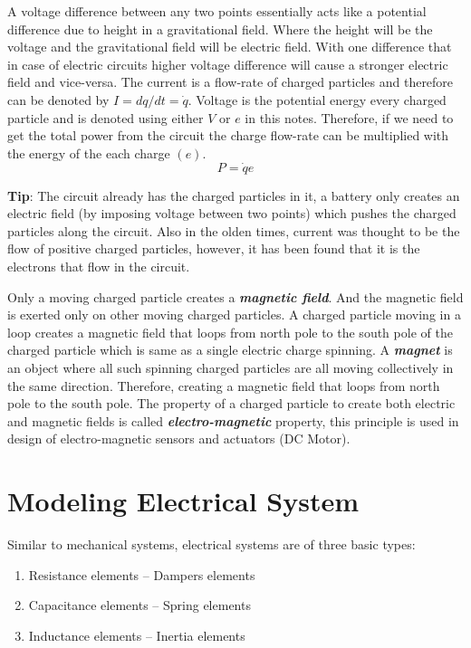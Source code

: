 A voltage difference between any two points essentially acts like a potential difference due to height in a gravitational field. Where the height will be the voltage and the gravitational field will be electric field. With one difference that in case of electric circuits higher voltage difference will cause a stronger electric field and vice-versa. The current is a flow-rate of charged particles and therefore can be denoted by $I  = dq/dt = \dot{q}$. Voltage is the potential energy every charged particle and is denoted using either $V$ or $e$ in this notes. Therefore, if we need to get the total power from the circuit the charge flow-rate can be multiplied with the energy of the each charge $(e)$. $$ P = \dot{q} e $$

\textbf{Tip}: The circuit already has the charged particles in it, a battery only creates an electric field (by imposing voltage between two points) which pushes the charged particles along the circuit. Also in the olden times, current was thought to be the flow of positive charged particles, however, it has been found  that it is the electrons that flow in the circuit.

Only a moving charged particle creates a \textbf{\textit{magnetic field}}. And the magnetic field is exerted only on other moving charged particles. A charged particle moving in a loop creates a magnetic field that loops from north pole to the south pole of the charged particle which is same as a single electric charge spinning. A \textbf{\textit{magnet}} is an object where all such spinning charged particles are all moving collectively in the same direction. Therefore, creating a magnetic field that loops from north pole to the south pole. The property of a charged particle to create both electric and magnetic fields is called \textbf{\textit{electro-magnetic}} property, this principle is used in design of electro-magnetic sensors and actuators (DC Motor).

\section{Modeling Electrical System}

Similar to mechanical systems, electrical systems are of three basic types:
\begin{enumerate}
	\item Resistance elements -- Dampers elements
	\item Capacitance elements -- Spring elements
	\item Inductance elements -- Inertia elements
\end{enumerate}


